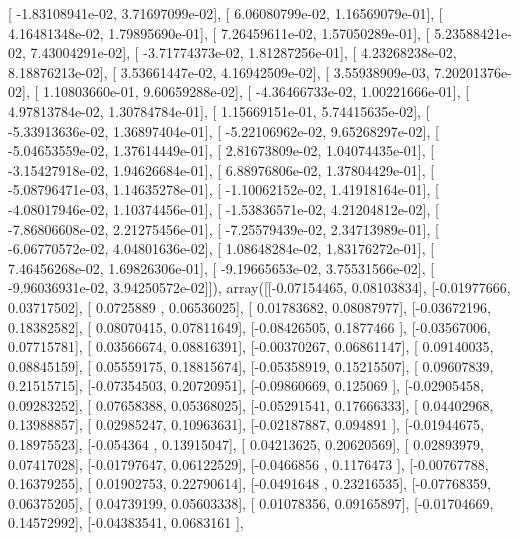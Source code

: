 \documentclass{article}
\begin{document}
       [ -1.83108941e-02,   3.71697099e-02],
       [  6.06080799e-02,   1.16569079e-01],
       [  4.16481348e-02,   1.79895690e-01],
       [  7.26459611e-02,   1.57050289e-01],
       [  5.23588421e-02,   7.43004291e-02],
       [ -3.71774373e-02,   1.81287256e-01],
       [  4.23268238e-02,   8.18876213e-02],
       [  3.53661447e-02,   4.16942509e-02],
       [  3.55938909e-03,   7.20201376e-02],
       [  1.10803660e-01,   9.60659288e-02],
       [ -4.36466733e-02,   1.00221666e-01],
       [  4.97813784e-02,   1.30784784e-01],
       [  1.15669151e-01,   5.74415635e-02],
       [ -5.33913636e-02,   1.36897404e-01],
       [ -5.22106962e-02,   9.65268297e-02],
       [ -5.04653559e-02,   1.37614449e-01],
       [  2.81673809e-02,   1.04074435e-01],
       [ -3.15427918e-02,   1.94626684e-01],
       [  6.88976806e-02,   1.37804429e-01],
       [ -5.08796471e-03,   1.14635278e-01],
       [ -1.10062152e-02,   1.41918164e-01],
       [ -4.08017946e-02,   1.10374456e-01],
       [ -1.53836571e-02,   4.21204812e-02],
       [ -7.86806608e-02,   2.21275456e-01],
       [ -7.25579439e-02,   2.34713989e-01],
       [ -6.06770572e-02,   4.04801636e-02],
       [  1.08648284e-02,   1.83176272e-01],
       [  7.46456268e-02,   1.69826306e-01],
       [ -9.19665653e-02,   3.75531566e-02],
       [ -9.96036931e-02,   3.94250572e-02]]), array([[-0.07154465,  0.08103834],
       [-0.01977666,  0.03717502],
       [ 0.0725889 ,  0.06536025],
       [ 0.01783682,  0.08087977],
       [-0.03672196,  0.18382582],
       [ 0.08070415,  0.07811649],
       [-0.08426505,  0.1877466 ],
       [-0.03567006,  0.07715781],
       [ 0.03566674,  0.08816391],
       [-0.00370267,  0.06861147],
       [ 0.09140035,  0.08845159],
       [ 0.05559175,  0.18815674],
       [-0.05358919,  0.15215507],
       [ 0.09607839,  0.21515715],
       [-0.07354503,  0.20720951],
       [-0.09860669,  0.125069  ],
       [-0.02905458,  0.09283252],
       [ 0.07658388,  0.05368025],
       [-0.05291541,  0.17666333],
       [ 0.04402968,  0.13988857],
       [ 0.02985247,  0.10963631],
       [-0.02187887,  0.094891  ],
       [-0.01944675,  0.18975523],
       [-0.054364  ,  0.13915047],
       [ 0.04213625,  0.20620569],
       [ 0.02893979,  0.07417028],
       [-0.01797647,  0.06122529],
       [-0.0466856 ,  0.1176473 ],
       [-0.00767788,  0.16379255],
       [ 0.01902753,  0.22790614],
       [-0.0491648 ,  0.23216535],
       [-0.07768359,  0.06375205],
       [ 0.04739199,  0.05603338],
       [ 0.01078356,  0.09165897],
       [-0.01704669,  0.14572992],
       [-0.04383541,  0.0683161 ],
\end{document}
